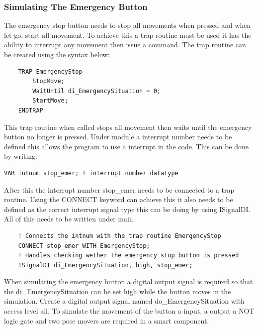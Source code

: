 \documentclass[a4paper,12pt]{article}
\begin{document}
\subsubsection{Simulating The Emergency Button}
The emergency stop button needs to stop all movements when pressed and when let go, start all movement. To achieve this a trap routine must be used it has the ability to interrupt any movement then issue a command. The trap routine can be created using the syntax below:
\begin{lstlisting}
    TRAP EmergencyStop
        StopMove;
        WaitUntil di_EmergencySituation = 0;
        StartMove;
    ENDTRAP
\end{lstlisting}
This trap routine when called stops all movement then waits until the emergency button no longer is pressed. Under module a interrupt number needs to be defined this allows the program to use a interrupt in the code. This can be done by writing: 
\begin{lstlisting}
VAR intnum stop_emer; ! interrupt number datatype
\end{lstlisting}
After this the interrupt number stop\_emer needs to be connected to a trap routine. Using the CONNECT keyword can achieve this it also needs to be defined as the correct interrupt signal type this can be doing by using ISignalDI. All of this needs to be written under main.
\begin{lstlisting}
    ! Connects the intnum with the trap routine EmergencyStop
    CONNECT stop_emer WITH EmergencyStop;
    ! Handles checking wether the emergency stop button is pressed
    ISignalDI di_EmergencySituation, high, stop_emer;
\end{lstlisting}

When simulating the emergency button a digital output signal is required so that the di\_EmergencySituation can be set high while the button moves in the simulation. Create a digital output signal named do\_EmergencySituation with access level all. To simulate the movement of the button a input, a output a NOT logic gate and two pose movers are required in a smart component. 
\end{document}
